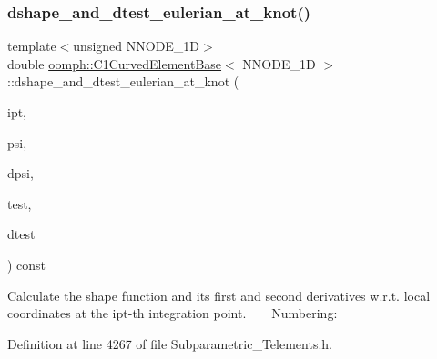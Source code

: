 \subsubsection{\texorpdfstring{dshape\+\_\+and\+\_\+dtest\+\_\+eulerian\+\_\+at\+\_\+knot()}{dshape\_and\_dtest\_eulerian\_at\_knot()}}
{\footnotesize\ttfamily template$<$unsigned N\+N\+O\+D\+E\+\_\+1D$>$ \\
double \hyperlink{classoomph_1_1C1CurvedElementBase}{oomph\+::\+C1\+Curved\+Element\+Base}$<$ N\+N\+O\+D\+E\+\_\+1D $>$\+::dshape\+\_\+and\+\_\+dtest\+\_\+eulerian\+\_\+at\+\_\+knot (\begin{DoxyParamCaption}\item[{const unsigned \&}]{ipt,  }\item[{\hyperlink{classoomph_1_1Shape}{Shape} \&}]{psi,  }\item[{\hyperlink{classoomph_1_1DShape}{D\+Shape} \&}]{dpsi,  }\item[{\hyperlink{classoomph_1_1Shape}{Shape} \&}]{test,  }\item[{\hyperlink{classoomph_1_1DShape}{D\+Shape} \&}]{dtest }\end{DoxyParamCaption}) const\hspace{0.3cm}{\ttfamily [inline]}}

Calculate the shape function and its first and second derivatives w.\+r.\+t. local coordinates at the ipt-\/th integration point. ~\newline
~\newline
 Numbering\+: 

Definition at line 4267 of file Subparametric\+\_\+\+Telements.\+h.

\mbox{\label{classoomph_1_1C1CurvedElementBase_a2cd586d0a06b6dcff44487da273b3642}} 
